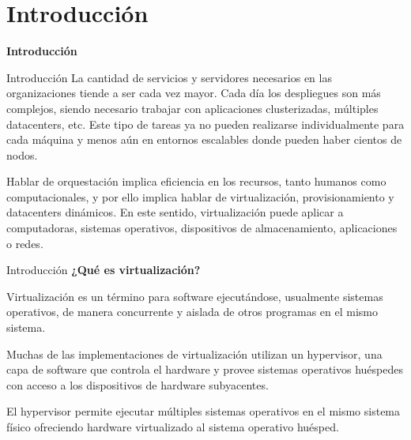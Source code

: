 \section{Introducción}

\begin{frame}
    \Huge
    \centering
    \textbf{Introducción}

\end{frame}


\begin{frame}{Introducción}
    \vspace{-1cm}
    La cantidad de servicios y servidores necesarios en las organizaciones tiende a ser cada vez mayor.
    Cada día los despliegues son más complejos, siendo necesario trabajar con aplicaciones clusterizadas, múltiples datacenters, etc.
    Este tipo de tareas ya no pueden realizarse individualmente para cada máquina y menos aún en entornos escalables donde pueden haber cientos de nodos.

    \begin{block}{}
        Hablar de orquestación implica eficiencia en los recursos, tanto humanos como computacionales, y por ello implica hablar de virtualización, provisionamiento y datacenters dinámicos. En este sentido, virtualización puede aplicar a computadoras, sistemas operativos, dispositivos de almacenamiento, aplicaciones o redes.
    \end{block}

\end{frame}

\begin{frame}{Introducción}
    \vspace{-0.5cm}
    \textbf{¿Qué es virtualización?}

    Virtualización es un término para software ejecutándose, usualmente sistemas operativos, de manera concurrente y aislada de otros programas en el mismo sistema. 

    \begin{block}{}
        Muchas de las implementaciones de virtualización utilizan un hypervisor, una capa de software que controla el hardware y provee sistemas operativos huéspedes con acceso a los dispositivos de hardware subyacentes. 
    \end{block}

    \begin{block}{}
        El hypervisor permite ejecutar múltiples sistemas operativos en el mismo sistema físico ofreciendo hardware virtualizado al sistema operativo huésped.
    \end{block}

\end{frame}

